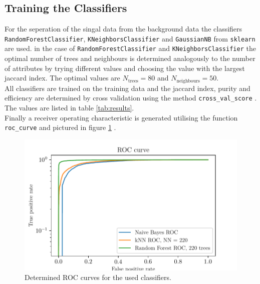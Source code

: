 \subsection{Training the Classifiers}

For the seperation of the singal data from the background data the classifiers \\
\texttt{RandomForestClassifier}, \texttt{KNeighborsClassifier}
and \texttt{GaussianNB} from \texttt{sklearn} are used. in the case of \texttt{RandomForestClassifier} and  \texttt{KNeighborsClassifier}
the optimal number of trees and neighbours is determined analogously to the number of attributes by trying different values and choosing
the value with the largest jaccard index. The optimal values are $N_\text{trees} = 80$ and $N_\text{neighbours} = 50$.\\
All classifiers are trained on the training data and the jaccard index, purity and efficiency are determined by cross validation using
the method \texttt{cross\_val\_score} \cite{scikit-learn}.
The values are listed in table \ref{tab:results}. \\
Finally a receiver operating characteristic is generated utilising the function \texttt{roc\_curve} and pictured in figure \ref{fig:ROC} \cite{scikit-learn}.

\begin{figure}[tb]
  \centering
  \includegraphics[width=12cm,keepaspectratio]{plots/ROC.pdf}
  \caption{Determined ROC curves for the used classifiers.}
  \label{fig:ROC}
\end{figure}

